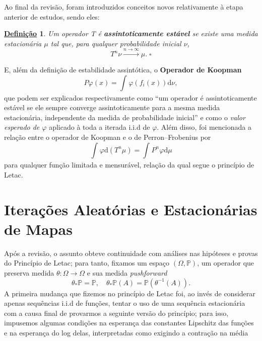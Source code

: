 \documentclass[12pt, a4paper]{article}
\newtheorem*{def*}{\underline{Definição}}
\theoremstyle{definition}
\begin{document}
Ao final da revisão, foram introduzidos conceitos novos relativamente à etapa anterior de estudos, sendo eles:
\begin{def*}
	Um operador T é \textbf{assintoticamente estável} se existe uma medida estacionária \(\mu \) tal que, para qualquer probabilidade inicial \(\nu \),
	\[
		T^{n}\nu\stackrel{n\to \infty} \longrightarrow \mu . \;\square
	\]
\end{def*}
E, além da definição de estabilidade assintótica, o \textbf{Operador de Koopman}
\[
	P\varphi (x)=\int_{}^{}\varphi (f_{i}(x)) \mathrm{d}\nu,
\]
que podem ser explicados respectivamente como ``um operador é assintoticamente estável se ele sempre converge assintoticamente para a mesma medida estacionária, independente da medida de probabilidade inicial'' e como o \textit{valor esperado de \(\varphi \)} aplicado à toda a iterada i.i.d de \(\varphi \).
Além disso, foi mencionada a relação entre o operador de Koopman e o de Perron--Frobenius por
\[
	\int_{}^{}\varphi \mathrm{d}(T^{n}\mu ) = \int_{}^{}P^{n}\varphi  \mathrm{d}\mu
\]
para qualquer função limitada e mensurável, relação da qual segue o princípio de Letac.

\section*{Iterações Aleatórias e Estacionárias de Mapas}

Após a revisão, o assunto obteve continuidade com análises nas hipóteses e provas do Princípio de Letac; para tanto, fixamos um espaço \((\Omega , \mathbb{P})\), um operador que preserva medida \(\theta :\Omega \rightarrow \Omega \) e sua medida \textit{pushforward}
\[
	\theta_{*}\mathbb{P} = \mathbb{P}, \quad  \theta _{*}\mathbb{P}(A)=\mathbb{P}(\theta^{-1}(A)).
\]
A primeira mudança que fizemos no princípio de Letac foi, ao invés de considerar apenas sequências i.i.d de funções, tentar o uso de uma sequência estacionária com a causa final de provarmos a seguinte versão do princípio; para isso, impusemos algumas condições na esperança das constantes Lipschitz das funções e na esperança do log delas, interpretadas como exigindo a contração na média
\end{document}
